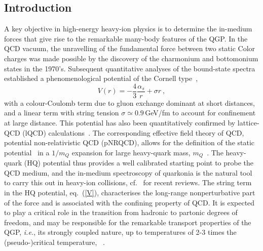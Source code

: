 \documentclass[../report.tex]{subfiles}
\begin{document}
\subsection{Introduction} %
\label{sec_intro}
A key objective in high-energy heavy-ion physics is to determine the in-medium forces that give rise to the remarkable many-body features of the QGP.
In the QCD vacuum, the unravelling of the fundamental force between two static Color charges was made possible by the discovery of the charmonium and bottomonium states in the 1970's. 
Subsequent quantitative analyses of the bound-state spectra established a phenomenological potential of the Cornell type~\cite{Eichten:1979ms}, 
\begin{equation}
V(r) = -\frac{4}{3} \frac{\alpha_s}{r} + \sigma r \ ,
\label{V}
\end{equation} 
with a colour-Coulomb term due to gluon exchange dominant at short distances, and a linear term with string tension $\sigma\simeq0.9$\,GeV/fm to account for confinement at large distance. 
This potential has also been quantitatively confirmed by lattice-QCD (lQCD) calculations~\cite{Bali:2000gf,Brambilla:2004jw}. 
The corresponding effective field theory of QCD, potential non-relativistic QCD (pNRQCD), allows for the definition of the static potential~\cite{Schroder:1998vy} in a  $1/m_Q$ expansion for large heavy-quark mass, $m_Q$~\cite{Brambilla:1999xf,Brambilla:2004wf}. 
The heavy-quark (HQ) potential thus provides a well calibrated starting point to probe the QCD medium, and the in-medium spectroscopy of quarkonia is the natural tool to carry this out in heavy-ion collisions, cf.~\cite{Rapp:2008tf,BraunMunzinger:2009ih,Kluberg:2009wc,Mocsy:2013syh,Liu:2015izf} 
for recent reviews.
The string term in the HQ potential, eq.~(\ref{V}), characterises the long-range nonperturbative part of the force and is associated with the confining property of QCD. It is expected to play a critical role in the transition from hadronic to partonic degrees of freedom, and may be responsible for the remarkable transport properties of the QGP, {\it i.e.}, its strongly coupled nature, up to temperatures of 2-3 times the (pseudo-)critical temperature, \Tc~\cite{Liu:2016ysz}. 
\end{document}
